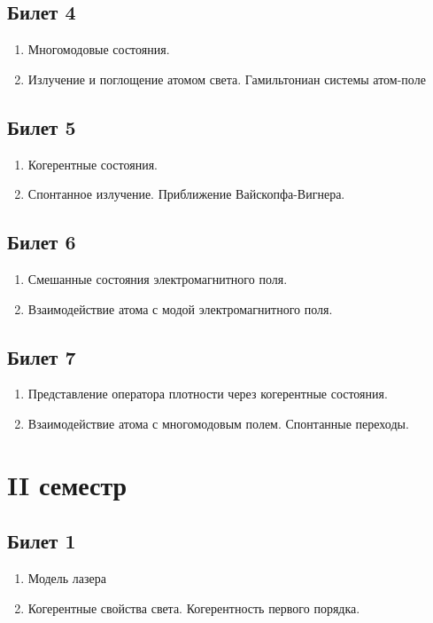 \documentclass[12pt,a4paper]{article}
\begin{document}
\subsection*{Билет 4} 
\begin{enumerate}
\item Многомодовые состояния. 
\item Излучение и поглощение атомом света. 
Гамильтониан системы атом-поле
\end{enumerate}

\subsection*{Билет 5} 
\begin{enumerate}
\item Когерентные состояния. 
\item Спонтанное излучение. Приближение Вайскопфа-Вигнера.
\end{enumerate}

\subsection*{Билет 6} 
\begin{enumerate}
\item Смешанные состояния электромагнитного поля. 
\item Взаимодействие
атома с модой электромагнитного поля. 
\end{enumerate}

\subsection*{Билет 7} 
\begin{enumerate}
\item Представление оператора плотности через когерентные
  состояния.
\item Взаимодействие атома с многомодовым полем. Спонтанные переходы.
\end{enumerate}

\section*{II семестр}

\subsection*{Билет 1} 
\begin{enumerate}
\item Модель лазера
\item Когерентные свойства света.
 Когерентность первого порядка.
\end{enumerate}
\end{document}
